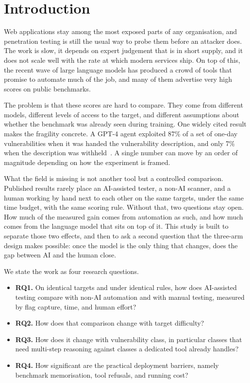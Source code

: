 \documentclass[11pt]{article}
\begin{document}
\section{Introduction}

Web applications stay among the most exposed parts of any organisation, and penetration testing is still the usual way to probe them before an attacker does. The work is slow, it depends on expert judgement that is in short supply, and it does not scale well with the rate at which modern services ship. On top of this, the recent wave of large language models has produced a crowd of tools that promise to automate much of the job, and many of them advertise very high scores on public benchmarks.

The problem is that these scores are hard to compare. They come from different models, different levels of access to the target, and different assumptions about whether the benchmark was already seen during training. One widely cited result makes the fragility concrete. A GPT-4 agent exploited 87\% of a set of one-day vulnerabilities when it was handed the vulnerability description, and only 7\% when the description was withheld~\cite{fang2024}. A single number can move by an order of magnitude depending on how the experiment is framed.

What the field is missing is not another tool but a controlled comparison. Published results rarely place an AI-assisted tester, a non-AI scanner, and a human working by hand next to each other on the same targets, under the same time budget, with the same scoring rule. Without that, two questions stay open. How much of the measured gain comes from automation as such, and how much comes from the language model that sits on top of it. This study is built to separate those two effects, and then to ask a second question that the three-arm design makes possible: once the model is the only thing that changes, does the gap between AI and the human close.

We state the work as four research questions.
\begin{itemize}
  \item \textbf{RQ1.} On identical targets and under identical rules, how does AI-assisted testing compare with non-AI automation and with manual testing, measured by flag capture, time, and human effort?
  \item \textbf{RQ2.} How does that comparison change with target difficulty?
  \item \textbf{RQ3.} How does it change with vulnerability class, in particular classes that need multi-step reasoning against classes a dedicated tool already handles?
  \item \textbf{RQ4.} How significant are the practical deployment barriers, namely benchmark memorisation, tool refusals, and running cost?
\end{itemize}
\end{document}
